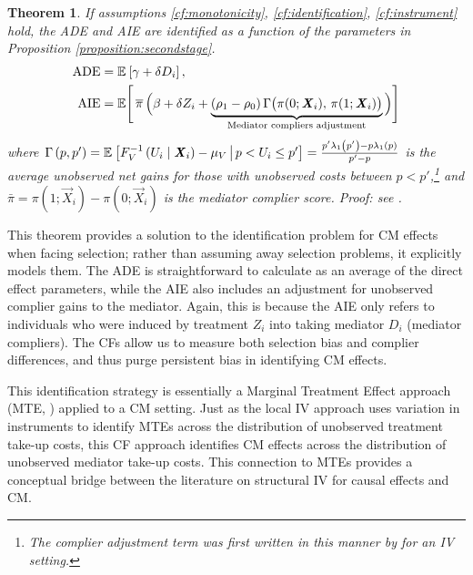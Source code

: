 \newtheorem{theoremCF}{Theorem}
\renewcommand\thetheoremCF{CF}
\begin{theoremCF}
    \label{thm:cf-identification}
    If assumptions \ref{cf:monotonicity}, \ref{cf:identification}, \ref{cf:instrument} hold, the ADE and AIE are identified as a function of the parameters in Proposition \ref{proposition:secondstage}.
    \begin{align*}
    \text{ADE}
        &= \mathbb{E}_{} \left[ \gamma + \delta D_i \right], \\
    \text{AIE}
        &= \mathbb E \Bigg[ \, \overline{\pi} \,
            \Big( \beta +  \delta Z_i +
                \underbrace{ (\rho_1 - \rho_0) \,
                \Gamma \big(\pi(0; \boldsymbol{\mathit{X}}_i), \, \pi(1; \boldsymbol{\mathit{X}}_i) \big)}_{
                    \text{Mediator compliers adjustment}} \Big) \Bigg]
    \end{align*}
    where $\Gamma\left(p,p'\right) 
    = \mathbb{E}_{} \left[  F_V^{-1}\left( U_i \mid \boldsymbol{\mathit{X}}_i \right) - \mu_V \, \middle\vert \, p < U_i \leq p' \right]
    = \frac{p'\lambda_1\left(p'\right) - p\lambda_1\left(p\right)}{p' - p}$ is the average unobserved net gains for those with unobserved costs between $p < p'$,\footnote{
        The complier adjustment term was first written in this manner by \cite{kline2019heckits} for an IV setting.
    } and $\bar\pi = \pi(1; \vec X_i) - \pi(0; \vec X_i)$ is the mediator complier score.
    Proof: see .
\end{theoremCF}

This theorem provides a solution to the identification problem for CM effects when facing selection;
rather than assuming away selection problems, it explicitly models them.
The ADE is straightforward to calculate as an average of the direct effect parameters, while the AIE also includes an adjustment for unobserved complier gains to the mediator.
Again, this is because the AIE only refers to individuals who were induced by treatment $Z_i$ into taking mediator $D_i$ (mediator compliers).
The CFs allow us to measure both selection bias and complier differences, and thus purge persistent bias in identifying CM effects.

This identification strategy is essentially a Marginal Treatment Effect approach (MTE, \citealt{bjorklund1987estimation,heckman2005structural}) applied to a CM setting.
Just as the local IV approach uses variation in instruments to identify MTEs across the distribution of unobserved treatment take-up costs, this CF approach identifies CM effects across the distribution of unobserved mediator take-up costs.
This connection to MTEs provides a conceptual bridge between the literature on structural IV for causal effects and CM.

